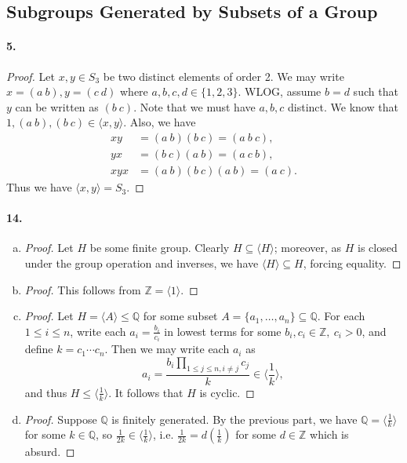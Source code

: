 \documentclass{article}
\begin{document}
\subsection{Subgroups Generated by Subsets of a Group}

\paragraph{5.}
\begin{proof}
  Let $x, y \in S_3$ be two distinct elements of order 2. We may write $x = (a\
  b), y = (c\ d)$ where $a, b, c, d \in \{1, 2, 3\}$. WLOG, assume $b = d$ such
  that $y$ can be written as $(b\ c)$. Note that we must have $a, b, c$
  distinct. We know that $1, (a\ b), (b\ c) \in \langle x, y \rangle$. Also, we
  have
  \begin{align*}
    xy &= (a\ b)(b\ c) = (a\ b\ c), \\
    yx &= (b\ c)(a\ b) = (a\ c\ b), \\
    xyx &= (a\ b)(b\ c)(a\ b) = (a\ c).
  \end{align*}
  Thus we have $\langle x, y \rangle = S_3$.
\end{proof}

\paragraph{14.}
\begin{enumerate}[(a)]
  \item \begin{proof}
      Let $H$ be some finite group. Clearly $H \subseteq \langle H \rangle$;
      moreover, as $H$ is closed under the group operation and inverses, we have
      $\langle H \rangle \subseteq H$, forcing equality.
    \end{proof}
  \item \begin{proof}
      This follows from $\mathbb{Z} = \langle 1 \rangle$.
    \end{proof}
  \item \begin{proof}
      Let $H = \langle A \rangle \leq \mathbb{Q}$ for some subset $A = \{a_1,
      \ldots, a_n\} \subseteq \mathbb{Q}$. For each $1 \leq i \leq n$, write
      each $a_i = \frac{b_i}{c_i}$ in lowest terms for some $b_i, c_i \in
      \mathbb{Z},\ c_i > 0$, and define $k = c_1 \cdots c_n$. Then we may write
      each $a_i$ as \[
        a_i = \frac{b_i\prod_{1 \leq j \leq n, i \neq j} c_j}{k}
        \in \langle \frac{1}{k} \rangle,
      \] and thus $H \leq \langle \frac{1}{k} \rangle$. It follows that $H$ is
      cyclic.
    \end{proof}
  \item \begin{proof}
      Suppose $\mathbb{Q}$ is finitely generated. By the previous part, we have
      $\mathbb{Q} = \langle \frac{1}{k} \rangle$ for some $k \in \mathbb{Q}$,
      so $\frac{1}{2k} \in \langle \frac{1}{k} \rangle$, i.e. $\frac{1}{2k} =
      d\left(\frac{1}{k}\right)$ for some $d \in \mathbb{Z}$ which is absurd.
    \end{proof}
\end{enumerate}
\end{document}

